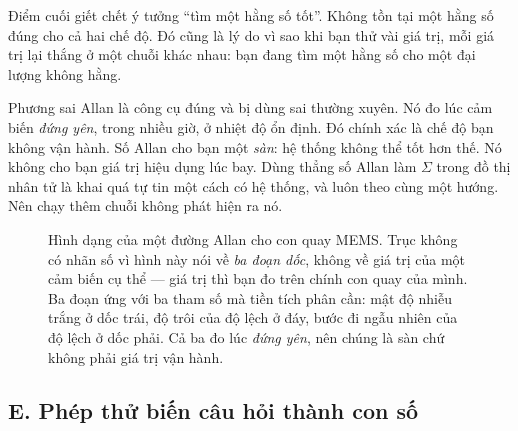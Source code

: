 \documentclass[../../deep_learning.tex]{subfiles}
\begin{document}
Điểm cuối giết chết ý tưởng ``tìm một hằng số tốt''. Không tồn tại một hằng số đúng cho cả hai chế độ. Đó cũng là lý do vì sao khi bạn thử vài giá trị, mỗi giá trị lại thắng ở một chuỗi khác nhau: bạn đang tìm một hằng số cho một đại lượng không hằng.

\begin{cambay}
Phương sai Allan là công cụ đúng và bị dùng sai thường xuyên. Nó đo lúc cảm biến \emph{đứng yên}, trong nhiều giờ, ở nhiệt độ ổn định. Đó chính xác là chế độ bạn không vận hành. Số Allan cho bạn một \emph{sàn}: hệ thống không thể tốt hơn thế. Nó không cho bạn giá trị hiệu dụng lúc bay. Dùng thẳng số Allan làm \(\Sigma\) trong đồ thị nhân tử là khai quá tự tin một cách có hệ thống, và luôn theo cùng một hướng. Nên chạy thêm chuỗi không phát hiện ra nó.
\end{cambay}

\begin{figure}[H]\centering
{}
\caption{Hình dạng của một đường Allan cho con quay MEMS. Trục không có nhãn số vì hình này nói về \emph{ba đoạn dốc}, không về giá trị của một cảm biến cụ thể --- giá trị thì bạn đo trên chính con quay của mình. Ba đoạn ứng với ba tham số mà tiền tích phân cần: mật độ nhiễu trắng ở dốc trái, độ trôi của độ lệch ở đáy, bước đi ngẫu nhiên của độ lệch ở dốc phải. Cả ba đo lúc \emph{đứng yên}, nên chúng là sàn chứ không phải giá trị vận hành.}
\label{fig:f34-allan}
\end{figure}

\subsection{E. Phép thử biến câu hỏi thành con số}
\end{document}

